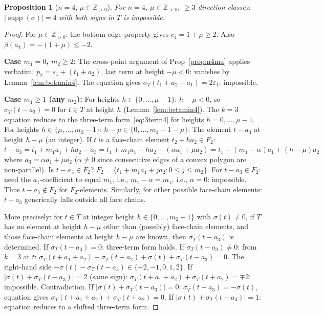 \documentclass{article}
\newtheorem{prop}{Proposition}
\begin{document}
\begin{prop}[$n=4$, $\mu\in\mathbb{Z}_{>0}$]\label{prop:n4muZ}
For $n=4$, $\mu\in\mathbb{Z}_{>0}$, $\ge 3$ direction classes:
$|\operatorname{supp}(\sigma)|=4$ with both signs in $T$ is impossible.
\end{prop}
\begin{proof}
For $\mu\in\mathbb{Z}_{>0}$: the bottom-edge property gives $c_4=1+\mu\ge 2$.  Also $\beta(a_4)=-(1+\mu)\le -2$.

\textbf{Case $m_1=0$, $m_2\ge 2$:}
The cross-point argument of Prop~\ref{prop:n4mu} applies verbatim:
$p_2=s_1+(t_1+a_2)$, last term at height $-\mu<0$: vanishes by Lemma~\ref{lem:betamin4}.
The equation gives $\sigma_T(t_1+a_2-a_1)=2\varepsilon_1$: impossible.

\textbf{Case $m_1\ge 1$ (any $m_2$):}
For heights $h\in\{0,\dots,\mu-1\}$: $h-\mu<0$, so $\sigma_T(t-a_3)=0$ for $t\in T$ at height $h$ (Lemma~\ref{lem:betamin4}).
The $k=3$ equation reduces to the three-term form~\eqref{eq:3term4} for heights $h=0,\dots,\mu-1$.
For heights $h\in\{\mu,\dots,m_2-1\}$: $h-\mu\in\{0,\dots,m_2-1-\mu\}$.
The element $t-a_3$ at height $h-\mu$ (an integer).  If $t$ is a face-chain element $t_2+ha_2\in F_2$:
$t-a_3=t_1+m_1a_1+ha_2-a_3=t_1+m_1a_1+ha_2-(\alpha a_1+\mu a_2)=t_1+(m_1-\alpha)a_1+(h-\mu)a_2$
where $a_3=\alpha a_1+\mu a_2$ ($\alpha\ne 0$ since consecutive edges of a convex polygon are non-parallel).
Is $t-a_3\in F_2$?  $F_2=\{t_1+m_1a_1+ja_2:0\le j\le m_2\}$.  For $t-a_3\in F_2$: need the $a_1$-coefficient to equal $m_1$, i.e., $m_1-\alpha=m_1$, i.e., $\alpha=0$: impossible.
Thus $t-a_3\notin F_2$ for $F_2$-elements.
Similarly, for other possible face-chain elements: $t-a_3$ generically falls outside all face chains.

More precisely: for $t\in T$ at integer height $h\in\{0,\dots,m_2-1\}$ with $\sigma(t)\ne 0$,
if $T$ has no element at height $h-\mu$ other than (possibly) face-chain elements, and those
face-chain elements at height $h-\mu$ are known, then $\sigma_T(t-a_3)$ is determined.
If $\sigma_T(t-a_3)=0$: three-term form holds.
If $\sigma_T(t-a_3)\ne 0$: from $k=3$ at $t$:
$\sigma_T(t+a_1+a_2)+\sigma_T(t+a_2)+\sigma(t)+\sigma_T(t-a_3)=0$.
The right-hand side $-\sigma(t)-\sigma_T(t-a_3)\in\{-2,-1,0,1,2\}$.
If $|\sigma(t)+\sigma_T(t-a_3)|=2$ (same sign): $\sigma_T(t+a_1+a_2)+\sigma_T(t+a_2)=\mp 2$:
impossible.  Contradiction.
If $|\sigma(t)+\sigma_T(t-a_3)|=0$: $\sigma_T(t-a_3)=-\sigma(t)$, equation gives $\sigma_T(t+a_1+a_2)+\sigma_T(t+a_2)=0$.
If $|\sigma(t)+\sigma_T(t-a_3)|=1$: equation reduces to a shifted three-term form.


\end{proof}
\end{document}
